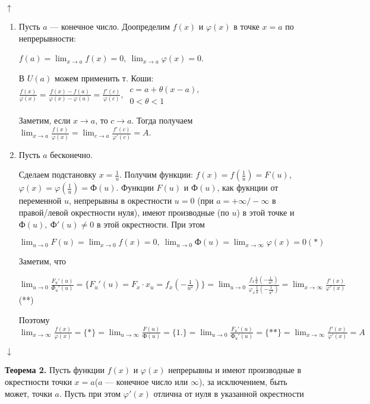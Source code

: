 \documentclass{article}
\begin{document}
    \(\uparrow\)
    \begin{enumerate}
        \item Пусть \(a\) --- конечное число. Доопределим \(f(x)\) и \(\varphi(x)\) в точке \(x=a\) по непрерывности:

        \(f(a) = \lim_{x \to a} f(x) = 0,\ \lim_{x \to a} \varphi(x) = 0\).

        В \(U(a)\) можем применить т. Коши: \(\frac{f(x)}{\varphi(x)} = \frac{f(x) - f(a)}{\varphi(x) - \varphi(a)} = \frac{f'(c)}{\varphi(c)},\ \begin{array}{l} c = a + \theta(x-a),\\ 0 < \theta < 1\end{array}\)

        Заметим, если \(x \to a\), то \(c \to a\). Тогда получаем \(\lim_{x \to a} \frac{f(x)}{\varphi(x)} = \lim_{c \to a} \frac{f'(c)}{\varphi'(c)} = A\).
        
        \item Пусть $a$ бесконечно.
        
        Сделаем подстановку \( x = \frac{1}{u} \). Получим функции: \( f(x) = f(\frac{1}{u}) = F(u) \), \( \varphi(x) = \varphi(\frac{1}{u}) = \textrm{Ф}(u) \). Функции \( F(u) \) и \( \textrm{Ф}(u) \), как фукнции от переменной $u$, непрерывны в окрестности $u = 0$ (при $a = +\infty/-\infty$ в правой/левой окрестности нуля), имеют производные (по $u$) в этой точке и \( \textrm{Ф}(u),\ \textrm{Ф}'(u) \neq 0 \) в этой окрестности. При этом

        \( \lim_{u \to 0}F(u) = \lim_{x \to 0}f(x) = 0,\ \lim_{u \to 0}\textrm{Ф}(u) = \lim_{x \to \infty}\varphi(x) = 0 (*) \) 
        
        Заметим, что 

        \(\lim_{u \to 0} \frac{F_u'(u)}{\Phi_u'(u)} = \{F_u'(u) = F_x \cdot x_u = f_x(-\frac{1}{u^2})\} = \lim_{u \to 0} \frac{f_x\frac{1}{u}(-\frac{1}{u^2})}{\varphi_x\frac{1}{u}(-\frac{1}{u^2})} = \lim_{x \to \infty} \frac{f'(x)}{\varphi'(x)}\)(**)
    
        Поэтому \( \lim_{x \to \infty}\frac{f(x)}{\varphi(x)} = \{*\} = \lim_{u \to \infty}\frac{F(u)}{\textrm{Ф}(u)} = \{1.\} = \lim_{u \to 0}\frac{F_u'(u)}{\textrm{Ф}_u'(u)} = \{**\} = \lim_{x \to \infty}\frac{f'(x)}{\varphi'(x)} = A \)
    \end{enumerate}
    \(\downarrow\)

    \textbf{Теорема 2.} Пусть функции \(f(x)\) и \(\varphi(x)\) непрерывны и имеют производные в окрестности точки \(x=a\)(\(a\) --- конечное число или \(\infty\)), за исключением, быть может, точки \(a\). Пусть при этом \(\varphi'(x)\) отлична от нуля в указанной окрестности
\end{document}
